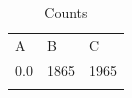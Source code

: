 \documentclass{svjour2}
\begin{document}
\begin{table}
\caption{Counts}
\begin{tabular}{lll}
\hline\noalign{\smallskip}
A & B & C \\[2pt]
\tableheadseprule\noalign{\smallskip}
0.0 & 1865 & 1965 \\
\noalign{\smallskip}\hline
\end{tabular}
\end{table}
\end{document}
